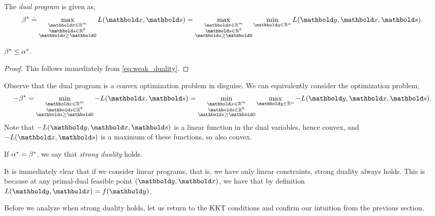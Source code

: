 \begin{defn} The \emph{dual program} is given as, \begin{align}
    \s{\beta} \defeq \max_{\substack{\vx \in \R^m \\ \vs \in \R^k \\ \vs \geq \vZero}} L(\vx, \vs) = \max_{\substack{\vx \in \R^m \\ \vs \in \R^k \\ \vs \geq \vZero}} \min_{\vy \in \R^n} L(\vy, \vx, \vs).
\end{align}
\end{defn}
\begin{thm}
$\beta^* \leq \alpha^*$.
\end{thm}
\begin{proof}
This follows immediately from \cref{eq:weak_duality}.
\end{proof}
\begin{rmk}
Observe that the dual program is a convex optimization problem in disguise. We can equivalently consider the optimization problem, \begin{align}
    -\s{\beta} = \min_{\substack{\vx \in \R^m \\ \vs \in \R^k \\ \vs \geq \vZero}} - L(\vx, \vs) = \min_{\substack{\vx \in \R^m \\ \vs \in \R^k \\ \vs \geq \vZero}} \max_{\vy \in \R^n} - L(\vy, \vx, \vs).
\end{align} Note that $-L(\vy, \vx, \vs)$ is a linear function in the dual variables, hence convex, and $-L(\vx, \vs)$ is a maximum of these functions, so also convex.
\end{rmk}

\begin{defn} If $\alpha^* = \beta^*$, we say that \emph{strong duality} holds.
\end{defn}
\begin{rmk}
It is immediately clear that if we consider linear programs, that is, we have only linear constraints, strong duality always holds. This is because at any primal-dual feasible point $(\vy, \vx)$, we have that by definition $L(\vy, \vx) = f(\vy)$.
\end{rmk}

Before we analyze when strong duality holds, let us return to the KKT conditions and confirm our intuition from the previous section.

